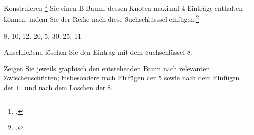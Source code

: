 \documentclass{bschlangaul-aufgabe}
\begin{document}

Konstruieren
\footcite{examen:66116:2017:03} Sie einen B-Baum, dessen Knoten maximal $4$ Einträge
enthalten können, indem Sie der Reihe nach diese Suchschlüsssel
einfügen:\footcite[Aufgabe 3]{aud:ab:5}

\begin{center}
8, 10, 12, 20, 5, 30, 25, 11
\end{center}

\noindent
Anschließend löschen Sie den Eintrag mit dem Suchschlüssel $8$.

Zeigen Sie jeweils graphisch den entstehenden Baum nach relevanten
Zwischenschritten; insbesondere nach Einfügen der $5$ sowie nach dem
Einfügen der $11$ und nach dem Löschen der $8$.
\end{document}
